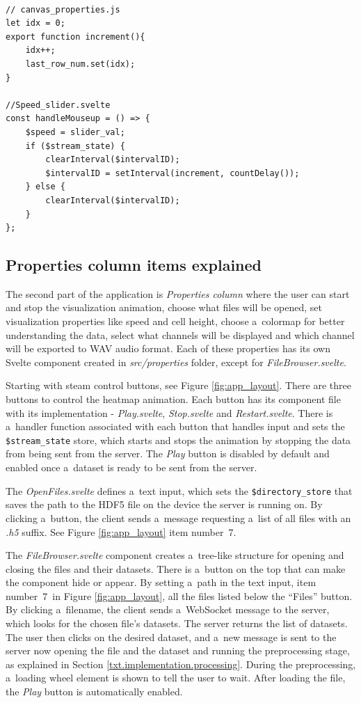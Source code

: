 \begin{verbatim}
    
// canvas_properties.js
let idx = 0;
export function increment(){
    idx++;
    last_row_num.set(idx);
}

//Speed_slider.svelte
const handleMouseup = () => {
    $speed = slider_val;
    if ($stream_state) {
        clearInterval($intervalID);
        $intervalID = setInterval(increment, countDelay());
    } else {
        clearInterval($intervalID);
    }
};
\end{verbatim}



\subsection{Properties column items explained}

The second part of the application is \textit{Properties column} where the user can start and stop the visualization animation, choose what files will be opened, set visualization properties like speed and cell height, choose a~colormap for better understanding the data, select what channels will be displayed and which channel will be exported to WAV audio format. Each of these properties has its own Svelte component created in \textit{src/properties} folder, except for \textit{FileBrowser.svelte}.  

Starting with steam control buttons, see Figure \ref{fig:app_layout}. There are three buttons to control the heatmap animation. Each button has its component file with its implementation - \textit{Play.svelte}, \textit{Stop.svelte} and \textit{Restart.svelte}. There is a~handler function associated with each button that handles input and sets the \texttt{\$stream\_state} store, which starts and stops the animation by stopping the data from being sent from the server. The \textit{Play} button is disabled by default and enabled once a~dataset is ready to be sent from the server.

The \textit{OpenFiles.svelte} defines a~text input, which sets the \texttt{\$directory\_store} that saves the path to the HDF5 file on the device the server is running on. By clicking a~button, the client sends a~message requesting a~list of all files with an \textit{.h5} suffix. See Figure \ref{fig:app_layout} item number~7.

The \textit{FileBrowser.svelte} component creates a~tree-like structure for opening and closing the files and their datasets. There is a~button on the top that can make the component hide or appear. By setting a~path in the text input, item number~7~in Figure \ref{fig:app_layout}, all the files listed below the ``Files'' button. By clicking a~filename, the client sends a~WebSocket message to the server, which looks for the chosen file's datasets. The server returns the list of datasets. The user then clicks on the desired dataset, and a~new message is sent to the server now opening the file and the dataset and running the preprocessing stage, as explained in Section \ref{txt.implementation.processing}. During the preprocessing, a~loading wheel element is shown to tell the user to wait. After loading the file, the \textit{Play} button is automatically enabled.

